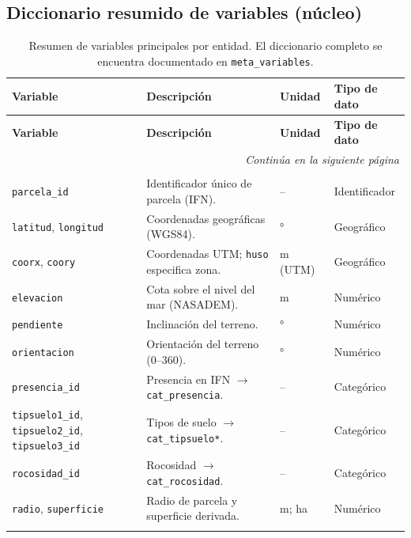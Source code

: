 \subsection*{Diccionario resumido de variables (núcleo)}
\small
\setlength{\LTcapwidth}{\textwidth}
\begin{longtable}{p{3.2cm} p{7.6cm} p{2.4cm} p{2.4cm}}
\caption{Resumen de variables principales por entidad. El diccionario completo se encuentra documentado en \texttt{meta\_variables}.}\\
\toprule
\textbf{Variable} & \textbf{Descripción} & \textbf{Unidad} & \textbf{Tipo de dato} \\
\midrule
\endfirsthead
\toprule
\textbf{Variable} & \textbf{Descripción} & \textbf{Unidad} & \textbf{Tipo de dato} \\
\midrule
\endhead
\midrule
\multicolumn{4}{r}{\emph{Continúa en la siguiente página}} \\
\midrule
\endfoot
\bottomrule
\endlastfoot

\multicolumn{4}{l}{\textbf{parcelas}} \\
\texttt{parcela\_id} & Identificador único de parcela (IFN). & -- & Identificador \\
\texttt{latitud}, \texttt{longitud} & Coordenadas geográficas (WGS84). & ° & Geográfico \\
\texttt{coorx}, \texttt{coory} & Coordenadas UTM; \texttt{huso} especifica zona. & m (UTM) & Geográfico \\
\texttt{elevacion} & Cota sobre el nivel del mar (NASADEM). & m & Numérico \\
\texttt{pendiente} & Inclinación del terreno. & ° & Numérico \\
\texttt{orientacion} & Orientación del terreno (0–360). & ° & Numérico \\
\texttt{presencia\_id} & Presencia en IFN $\rightarrow$ \texttt{cat\_presencia}. & -- & Categórico \\
\texttt{tipsuelo1\_id}, \texttt{tipsuelo2\_id}, \texttt{tipsuelo3\_id} & Tipos de suelo $\rightarrow$ \texttt{cat\_tipsuelo*}. & -- & Categórico \\
\texttt{rocosidad\_id} & Rocosidad $\rightarrow$ \texttt{cat\_rocosidad}. & -- & Categórico \\
\texttt{radio}, \texttt{superficie} & Radio de parcela y superficie derivada. & m; ha & Numérico \\
\addlinespace


\end{longtable}
